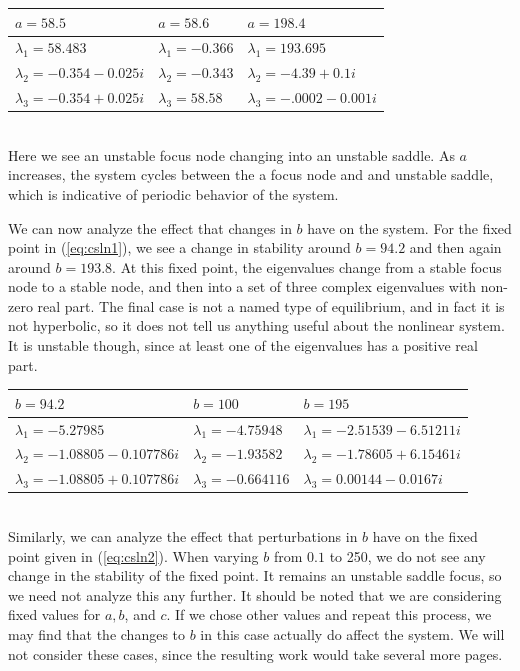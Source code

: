 \documentclass{article}
\begin{document}
\begin{center}
	\begin{tabular}{l | l | l}
		$a=58.5$                      & $a=58.6$             & $a=198.4$                   \\
		\hline
		$\lambda_{1}=58.483$          & $\lambda_{1}=-0.366$ & $\lambda_{1}=193.695$       \\
		$\lambda_{2}=-0.354 - 0.025i$ & $\lambda_{2}=-0.343$ & $\lambda_{2}=-4.39+0.1i $   \\
		$\lambda_{3}=-0.354 + 0.025i$ & $\lambda_{3}=58.58$  & $\lambda_{3}=-.0002-0.001i$
	\end{tabular}
\end{center}
\noindent\\
\noindent Here we see an unstable focus node changing into an unstable saddle. As $a$ increases, the system cycles between the a focus node and and unstable saddle, which is indicative of periodic behavior of the system.

We can now analyze the effect that changes in $b$ have on the system. For the fixed point in (\ref{eq:csln1}), we see a change in stability around $b=94.2$ and then again around $b=193.8$. At this fixed point, the eigenvalues change from a stable focus node to a stable node, and then into a set of three complex eigenvalues with non-zero real part. The final case is not a named type of equilibrium, and in fact it is not hyperbolic, so it does not tell us anything useful about the nonlinear system. It is unstable though, since at least one of the eigenvalues has a positive real part.
\begin{center}
	\begin{tabular}{l | l | l}
		$b=94.2$                           & $b=100$                 & $b=195$                           \\
		\hline
		$\lambda_{1}=-5.27985$             & $\lambda_{1}=-4.75948$  & $\lambda_{1}=-2.51539 - 6.51211i$ \\
		$\lambda_{2}=-1.08805 - 0.107786i$ & $\lambda_{2}=-1.93582$  & $\lambda_{2}=-1.78605 + 6.15461i$ \\
		$\lambda_{3}=-1.08805 + 0.107786i$ & $\lambda_{3}=-0.664116$ & $\lambda_{3}=0.00144 - 0.0167i$
	\end{tabular}
\end{center}
\noindent\\
\noindent Similarly, we can analyze the effect that perturbations in $b$ have on the fixed point given in (\ref{eq:csln2}). When varying $b$ from $0.1$ to 250, we do not see any change in the stability of the fixed point. It remains an unstable saddle focus, so we need not analyze this any further. It should be noted that we are considering fixed values for $a,b$, and $c$. If we chose other values and repeat this process, we may find that the changes to $b$ in this case actually do affect the system. We will not consider these cases, since the resulting work would take several more pages.
\end{document}
